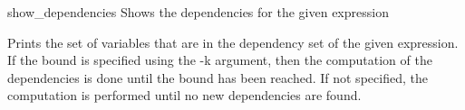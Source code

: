 \begin{nusmvCommand}{show\_dependencies} {Shows the dependencies for the given expression}


Prints the set of variables that are in the dependency set of the given expression.
If the bound is specified using the -k argument, then the computation of the dependencies is 
done until the bound has been reached.
If not specified, the computation is performed until no new dependencies are found.

\begin{cmdOpt}




\end{cmdOpt}

\end{nusmvCommand}
